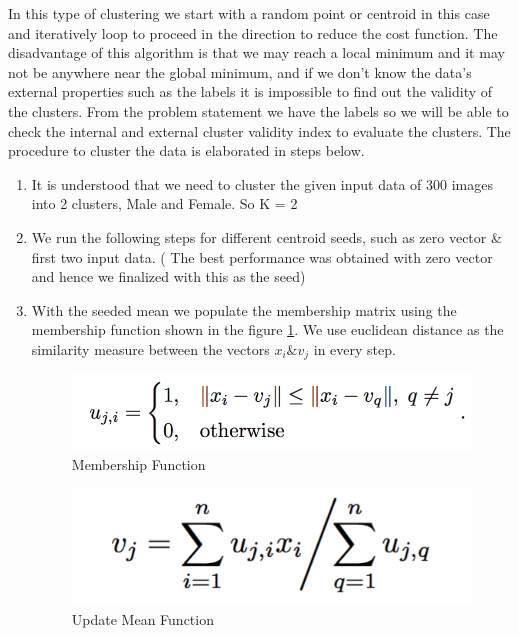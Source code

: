 \documentclass[conference]{IEEEtran}
\begin{document}
In this type of clustering we start with a random point or centroid in this case and iteratively loop to proceed in the direction to reduce the cost function. The disadvantage of this algorithm is that we may reach a local minimum and it may not be anywhere near the global minimum, and if we don't know the data's external properties such as the labels it is impossible to find out the validity of the clusters. From the problem statement we have the labels so we will be able to check the internal and external cluster validity index to evaluate the clusters. The procedure to cluster the data is elaborated in steps below. 
\begin{enumerate}[label=(\alph*)]
\item It is understood that we need to cluster the given input data of 300 images into 2 clusters, Male and Female. So K = 2
\item We run the following steps for different centroid seeds, such as zero vector \& first two input data. ( The best performance was obtained with zero vector and hence we finalized with this as the seed)
\item With the seeded mean we populate the membership matrix using the membership function shown in the figure \ref{fig:MembershipFunction}. We use euclidean distance as the similarity measure between the vectors $x_i \& v_j$ in every step. 

\begin{figure}[h!]
\centering
\includegraphics[scale = 0.5]{MembershipFunction}
\caption{Membership Function}
\label{fig:MembershipFunction}
\end{figure}

\begin{figure}[h!]
\centering
\includegraphics[scale=0.5]{UpdateMean}
\caption{ Update Mean Function}
\label {fig:UpdateMean}
\end{figure}


\end{enumerate}
\end{document}
